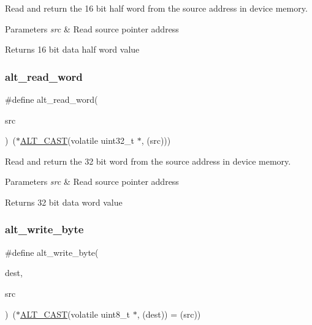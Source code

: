 Read and return the 16 bit half word from the source address in device memory. 
\begin{DoxyParams}{Parameters}
{\em src} & Read source pointer address \\
\hline
\end{DoxyParams}
\begin{DoxyReturn}{Returns}
16 bit data half word value 
\end{DoxyReturn}
\mbox{\label{group__ALT__SOCAL__UTIL__RW__FUNC_ga77db76edef8b90adb75eb837325b5d11}} 
\subsubsection{\texorpdfstring{alt\_read\_word}{alt\_read\_word}}
{\footnotesize\ttfamily \#define alt\+\_\+read\+\_\+word(\begin{DoxyParamCaption}\item[{}]{src }\end{DoxyParamCaption})~($\ast$\mbox{\hyperlink{group__ALT__SOCAL__UTIL_ga0c0d803769fc22ce2c319fc475febbde}{A\+L\+T\+\_\+\+C\+A\+ST}}(volatile uint32\+\_\+t $\ast$, (src)))}

Read and return the 32 bit word from the source address in device memory. 
\begin{DoxyParams}{Parameters}
{\em src} & Read source pointer address \\
\hline
\end{DoxyParams}
\begin{DoxyReturn}{Returns}
32 bit data word value 
\end{DoxyReturn}
\mbox{\label{group__ALT__SOCAL__UTIL__RW__FUNC_ga48f504d9c370e45073a9c5e142e1036d}} 
\subsubsection{\texorpdfstring{alt\_write\_byte}{alt\_write\_byte}}
{\footnotesize\ttfamily \#define alt\+\_\+write\+\_\+byte(\begin{DoxyParamCaption}\item[{}]{dest,  }\item[{}]{src }\end{DoxyParamCaption})~($\ast$\mbox{\hyperlink{group__ALT__SOCAL__UTIL_ga0c0d803769fc22ce2c319fc475febbde}{A\+L\+T\+\_\+\+C\+A\+ST}}(volatile uint8\+\_\+t $\ast$, (dest)) = (src))}

